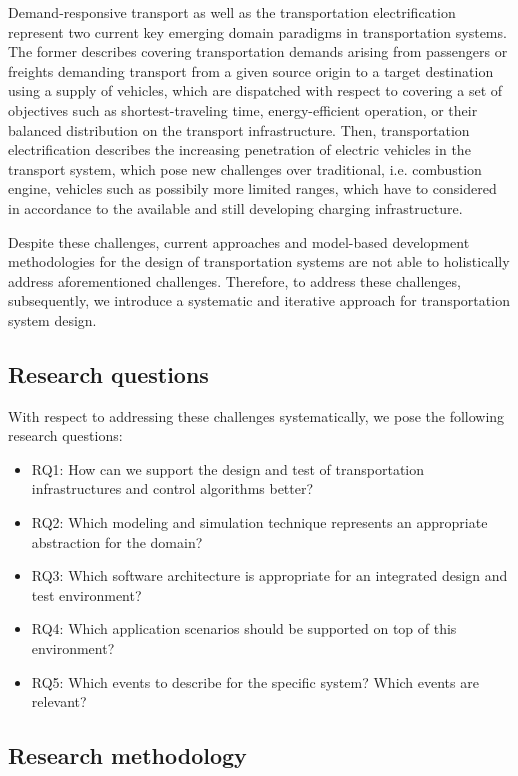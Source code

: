 \documentclass[graybox]{svmult}
\begin{document}
Demand-responsive transport \cite{brake_demand_2004} as well as the transportation electrification \cite{pereirinha2018main} represent two current key emerging domain paradigms in transportation systems. The former describes covering transportation demands arising from passengers or freights demanding transport from a given source origin to a target destination using a supply of vehicles, which are dispatched with respect to covering a set of objectives such as shortest-traveling time, energy-efficient operation, or their balanced distribution on the transport infrastructure. Then, transportation electrification describes the increasing penetration of electric vehicles in the transport system, which pose new challenges over traditional, i.e. combustion engine, vehicles such as possibily more limited ranges, which have to considered in accordance to the available and still developing charging infrastructure. 

Despite these challenges, current approaches and model-based development methodologies for the design of transportation systems are not able to holistically address aforementioned challenges. Therefore, to address these challenges, subsequently, we introduce a systematic and iterative approach for transportation system design.


\subsection{Research questions}
With respect to addressing these challenges systematically, we pose the following research questions:
\begin{itemize}
	\item RQ1: How can we support the design and test of transportation infrastructures and control algorithms better?
	\item RQ2: Which modeling and simulation technique represents an appropriate abstraction for the domain?
	\item RQ3: Which software architecture is appropriate for an integrated design and test environment?
	\item RQ4: Which application scenarios should be supported on top of this environment?
	\item RQ5: Which events to describe for the specific system? Which events are relevant?
\end{itemize}

\subsection{Research methodology}
\end{document}
